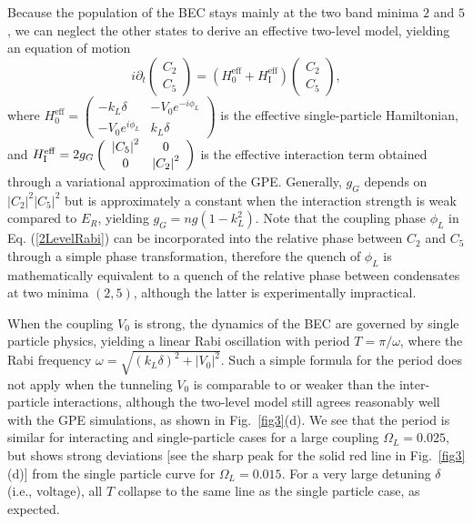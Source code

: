 \documentclass[twocolumn,prl,floatfix,citeautoscript,nofootinbib,superscriptaddress]{revtex4}
\begin{document}
Because the population of the BEC stays mainly at the two band minima $2$
and $5$, we can neglect the other states to derive an effective two-level
model, yielding an equation of motion \cite{Supp, Li2012}
\begin{equation}
i\partial _{t}\left(
\begin{array}{c}
C_{2} \\
C_{5}%
\end{array}%
\right) =\left( H_{0}^{\mathrm{eff}}+H_{\mathrm{I}}^{\mathrm{eff}}\right)
\left(
\begin{array}{c}
C_{2} \\
C_{5}%
\end{array}%
\right) ,  \label{2LevelRabi}
\end{equation}%
where $H_{0}^{\mathrm{eff}}=\left(
\begin{array}{cc}
-k_{L}\delta & -V_{0}e^{-i\phi _{L}} \\
-V_{0}e^{i\phi _{L}} & k_{L}\delta%
\end{array}%
\right) $ is the effective single-particle Hamiltonian, and $H_{\mathrm{I}}^{%
\mathrm{eff}}=2g_{G}\left(
\begin{array}{cc}
\left\vert C_{5}\right\vert ^{2} & 0 \\
0 & \left\vert C_{2}\right\vert ^{2}%
\end{array}%
\right) $ is the effective interaction term obtained through a variational
approximation of the GPE. Generally, $g_{G}$ depends on $\left\vert
C_{2}\right\vert ^{2}\left\vert C_{5}\right\vert ^{2}$ but is approximately
a constant when the interaction strength is weak compared to $E_{R}$,
yielding $g_{G}=ng(1-k_{L}^{2})$. Note that the coupling phase $\phi _{L}$
in Eq. (\ref{2LevelRabi}) can be incorporated into the relative phase
between $C_{2}$ and $C_{5}$ through a simple phase transformation, therefore
the quench of $\phi _{L}$ is mathematically equivalent to a quench of the
relative phase between condensates at two minima $\left( 2,5\right) $,
although the latter is experimentally impractical.

When the coupling $V_{0}$ is strong, the dynamics of the BEC are governed by
single particle physics, yielding a linear Rabi oscillation with period $%
T=\pi /\omega $, where the Rabi frequency $\omega =\sqrt{(k_{L}\delta
)^{2}+|V_{0}|^{2}}$. Such a simple formula for the period does not apply
when the tunneling $V_{0}$ is comparable to or weaker than the
inter-particle interactions, although the two-level model still agrees
reasonably well with the GPE simulations, as shown in Fig.~\ref{fig3}(d). We
see that the period is similar for interacting and single-particle cases for
a large coupling $\Omega _{L}=0.025$, but shows strong deviations [see the
sharp peak for the solid red line in Fig.~\ref{fig3}(d)] from the single
particle curve for $\Omega _{L}=0.015$. For a very large detuning $\delta $
(i.e., voltage), all $T$ collapse to the same line as the single particle
case, as expected.
\end{document}
